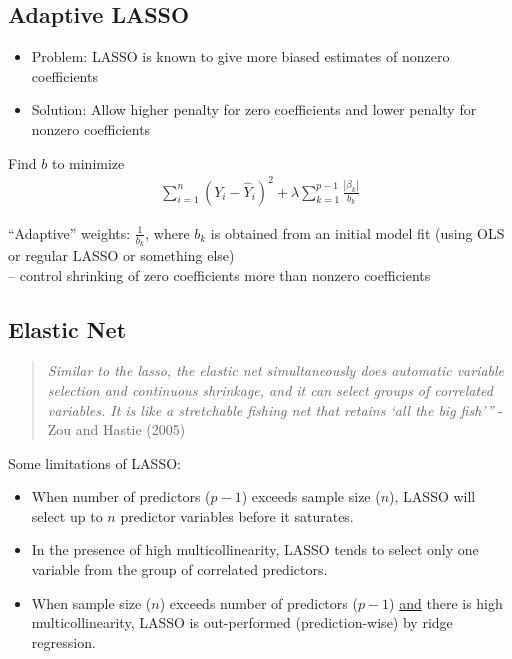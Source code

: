 \documentclass[12pt]{notes}
\begin{document}
\subsection{Adaptive LASSO}
\begin{itemize}
 \item  Problem: LASSO is known to give more biased estimates of nonzero coefficients
 \item  Solution: Allow higher penalty for zero coefficients and lower penalty for nonzero coefficients
\end{itemize}

\vspace{1em}

Find $b$ to minimize
  \begin{eqnarray}
    \sum_{i=1}^{n} \left( Y_i - \hat{Y}_i \right)^2 + \lambda \sum_{k=1}^{p-1} \frac{|\beta_k|}{b_k} \nonumber
  \end{eqnarray}

\vspace{1em}

``Adaptive'' weights: $\frac{1}{b_k}$, where $b_k$ is obtained from an initial model fit (using OLS or regular LASSO or something else) \\
-- control shrinking of zero coefficients more than nonzero coefficients\\

\subsection{Elastic Net}
\begin{quotation}
\textit{Similar to the lasso, the elastic net simultaneously does automatic variable selection and continuous shrinkage, and it can select groups of correlated variables. It is like a stretchable fishing net that retains ‘all the big fish’”} - Zou and Hastie (2005)
\end{quotation}

Some limitations of LASSO:
\begin{itemize}
  \item When number of predictors ($p-1$) exceeds sample size ($n$), LASSO will select up to $n$ predictor variables before it saturates.\\ \vspace{1em} %
  \item In the presence of high multicollinearity, LASSO tends to select only one variable from the group of correlated predictors.\\ \vspace{1em} %
  \item When sample size ($n$) exceeds number of predictors ($p-1$) \underline{and} there is high multicollinearity, LASSO is out-performed (prediction-wise) by ridge regression.
\end{itemize}
\end{document}

